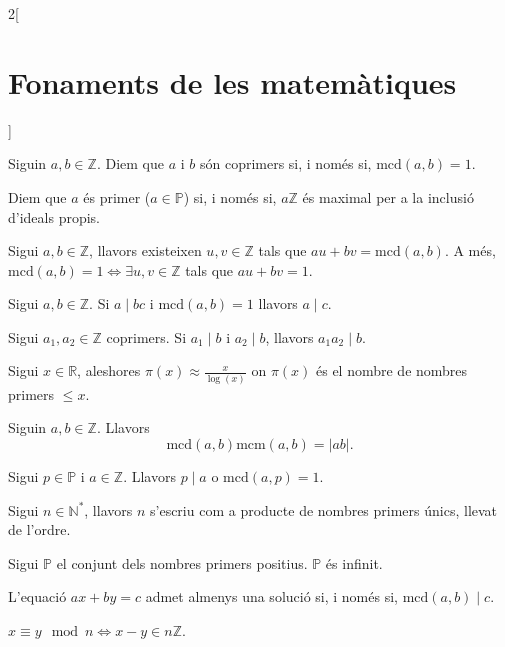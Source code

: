 \documentclass[class=article,10pt,crop=false]{standalone}
\begin{document}
\begin{multicols}{2}[\section{Fonaments de les matemàtiques}]
\begin{prop}
\end{prop}
\begin{definition}
Siguin $a,b\in\mathbb{Z}$. Diem que $a$ i $b$ són coprimers si, i només si, $\text{mcd}(a,b)=1$.
\end{definition}
\begin{definition}
Diem que $a$ és primer ($a\in\mathbb{P}$) si, i només si, $a\mathbb{Z}$ és maximal per a la inclusió d'ideals propis.
\end{definition}
\begin{theorem}
Sigui $a,b\in\mathbb{Z}$, llavors existeixen $u,v\in\mathbb{Z}$ tals que $au+bv=\text{mcd}(a,b)$. A més, $\text{mcd}(a,b)=1\iff\exists u,v\in\mathbb{Z}$ tals que $au+bv=1$.
\end{theorem}
\begin{theorem}
Sigui $a,b\in\mathbb{Z}$. Si $a\mid bc$ i $\text{mcd}(a,b)=1$ llavors $a\mid c$.
\end{theorem}
\begin{corollary}
Sigui $a_1,a_2\in\mathbb{Z}$ coprimers. Si $a_1\mid b$ i $a_2\mid b$, llavors $a_1a_2\mid b$.
\end{corollary}
\begin{theorem}
Sigui $x\in\mathbb{R}$, aleshores $\pi(x)\approx\frac{x}{\log(x)}$ on $\pi(x)$ és el nombre de nombres primers $\leq x$.
\end{theorem}
\begin{theorem}
Siguin $a,b\in\mathbb{Z}$. Llavors $$\text{mcd}(a,b)\text{mcm}(a,b)=|ab|.$$
\end{theorem}
\begin{lemma}
Sigui $p\in\mathbb{P}$ i $a\in\mathbb{Z}$. Llavors $p\mid a$ o $\text{mcd}(a,p)=1$.
\end{lemma}
\begin{theorem}
Sigui $n\in\mathbb{N}^*$, llavors $n$ s'escriu com a producte de nombres primers únics, llevat de l'ordre.
\end{theorem}
\begin{theorem}
Sigui $\mathbb{P}$ el conjunt dels nombres primers positius. $\mathbb{P}$ és infinit. 
\end{theorem}
\begin{theorem}
L'equació $ax+by=c$ admet almenys una solució si, i només si, $\text{mcd}(a,b)\mid c$.
\end{theorem}
\begin{definition}
$x\equiv y\mod n\iff x-y\in n\mathbb{Z}$.

\end{definition}
\end{multicols}
\end{document}
